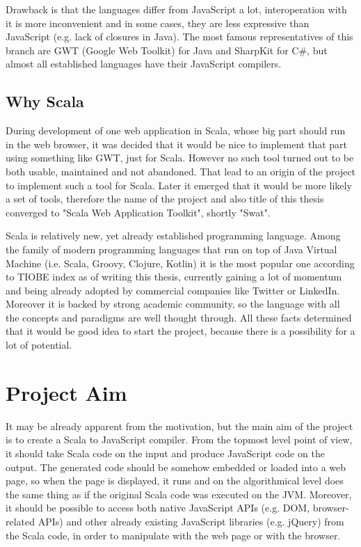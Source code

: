 \documentclass[12pt,a4paper]{report}
\begin{document}
Drawback is that the languages differ from JavaScript a lot, interoperation with it is more inconvenient and in some cases, they are less expressive than JavaScript (e.g. lack of closures in Java). The most famous representatives of this branch are GWT (Google Web Toolkit\cite{Gwt}) for Java and SharpKit\cite{SharpKit} for C\#, but almost all established languages have their JavaScript compilers.

\subsection{Why Scala}

During development of one web application in Scala, whose big part should run in the web browser, it was decided that it would be nice to implement that part using something like GWT, just for Scala. However no such tool turned out to be both usable, maintained and not abandoned. That lead to an origin of the project to implement such a tool for Scala. Later it emerged that it would be more likely a set of tools, therefore the name of the project and also title of this thesis converged to "Scala Web Application Toolkit", shortly "Swat".

Scala is relatively new, yet already established programming language. Among the family of modern programming languages that run on top of Java Virtual Machine (i.e. Scala, Groovy, Clojure, Kotlin) it is the most popular one according to TIOBE index\cite{Tiobe} as of writing this thesis, currently gaining a lot of momentum and being already adopted by commercial companies like Twitter or LinkedIn. Moreover it is backed by strong academic community, so the language with all the concepts and paradigms are well thought through. All these facts determined that it would be good idea to start the project, because there is a possibility for a lot of potential.

\section{Project Aim}

It may be already apparent from the motivation, but the main aim of the project is to create a Scala to JavaScript compiler. From the topmost level point of view, it should take Scala code on the input and produce JavaScript code on the output. The generated code should be somehow embedded or loaded into a web page, so when the page is displayed, it runs and on the algorithmical level does the same thing as if the original Scala code was executed on the JVM. Moreover, it should be possible to access both native JavaScript APIs (e.g. DOM\cite{Dom}, browser-related APIs) and other already existing JavaScript libraries (e.g. jQuery\cite{Jquery}) from the Scala code, in order to manipulate with the web page or with the browser.
\end{document}
